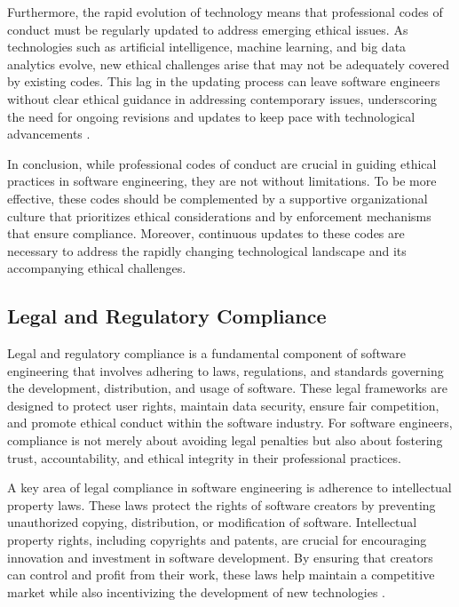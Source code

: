\begin{refsection}
Furthermore, the rapid evolution of technology means that professional codes of conduct must be regularly updated to address emerging ethical issues. As technologies such as artificial intelligence, machine learning, and big data analytics evolve, new ethical challenges arise that may not be adequately covered by existing codes. This lag in the updating process can leave software engineers without clear ethical guidance in addressing contemporary issues, underscoring the need for ongoing revisions and updates to keep pace with technological advancements \cite[pp.~220-223]{spinello2017ethical}.

In conclusion, while professional codes of conduct are crucial in guiding ethical practices in software engineering, they are not without limitations. To be more effective, these codes should be complemented by a supportive organizational culture that prioritizes ethical considerations and by enforcement mechanisms that ensure compliance. Moreover, continuous updates to these codes are necessary to address the rapidly changing technological landscape and its accompanying ethical challenges.

\subsection{Legal and Regulatory Compliance}

Legal and regulatory compliance is a fundamental component of software engineering that involves adhering to laws, regulations, and standards governing the development, distribution, and usage of software. These legal frameworks are designed to protect user rights, maintain data security, ensure fair competition, and promote ethical conduct within the software industry. For software engineers, compliance is not merely about avoiding legal penalties but also about fostering trust, accountability, and ethical integrity in their professional practices.

A key area of legal compliance in software engineering is adherence to intellectual property laws. These laws protect the rights of software creators by preventing unauthorized copying, distribution, or modification of software. Intellectual property rights, including copyrights and patents, are crucial for encouraging innovation and investment in software development. By ensuring that creators can control and profit from their work, these laws help maintain a competitive market while also incentivizing the development of new technologies \cite[pp.~55-58]{stallman2010free}.


\end{refsection}

